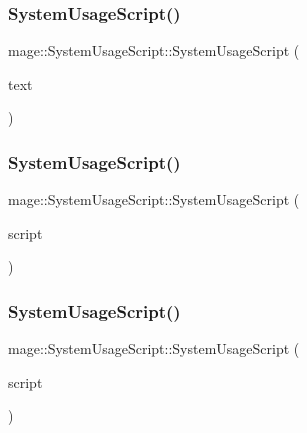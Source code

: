\subsubsection{\texorpdfstring{System\+Usage\+Script()}{SystemUsageScript()}\hspace{0.1cm}{\footnotesize\ttfamily [1/3]}}
{\footnotesize\ttfamily mage\+::\+System\+Usage\+Script\+::\+System\+Usage\+Script (\begin{DoxyParamCaption}\item[{\hyperlink{namespacemage_a1e01ae66713838a7a67d30e44c67703e}{Shared\+Ptr}$<$ \hyperlink{classmage_1_1_sprite_text}{Sprite\+Text} $>$}]{text }\end{DoxyParamCaption})\hspace{0.3cm}{\ttfamily [explicit]}}

\hypertarget{classmage_1_1_system_usage_script_a3fccc6dda27ede785fb9c45360e53bb0}{}\label{classmage_1_1_system_usage_script_a3fccc6dda27ede785fb9c45360e53bb0} 
\subsubsection{\texorpdfstring{System\+Usage\+Script()}{SystemUsageScript()}\hspace{0.1cm}{\footnotesize\ttfamily [2/3]}}
{\footnotesize\ttfamily mage\+::\+System\+Usage\+Script\+::\+System\+Usage\+Script (\begin{DoxyParamCaption}\item[{const \hyperlink{classmage_1_1_system_usage_script}{System\+Usage\+Script} \&}]{script }\end{DoxyParamCaption})\hspace{0.3cm}{\ttfamily [delete]}}

\hypertarget{classmage_1_1_system_usage_script_a013e7c6510442421d74bffa3b2f810fe}{}\label{classmage_1_1_system_usage_script_a013e7c6510442421d74bffa3b2f810fe} 
\subsubsection{\texorpdfstring{System\+Usage\+Script()}{SystemUsageScript()}\hspace{0.1cm}{\footnotesize\ttfamily [3/3]}}
{\footnotesize\ttfamily mage\+::\+System\+Usage\+Script\+::\+System\+Usage\+Script (\begin{DoxyParamCaption}\item[{\hyperlink{classmage_1_1_system_usage_script}{System\+Usage\+Script} \&\&}]{script }\end{DoxyParamCaption})\hspace{0.3cm}{\ttfamily [default]}}

